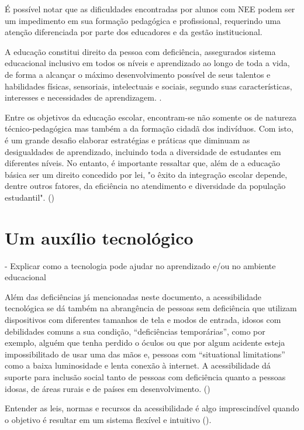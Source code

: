 É possível notar que as dificuldades encontradas por alunos com NEE podem ser um impedimento em sua formação pedagógica e profissional, requerindo uma atenção diferenciada por parte dos educadores e da gestão institucional. 

\begin{citacao}
    A educação constitui direito da pessoa com deficiência, assegurados sistema educacional inclusivo em todos os níveis e aprendizado ao longo de toda a vida, de forma a alcançar o máximo desenvolvimento possível de seus talentos e habilidades físicas, sensoriais, intelectuais e sociais, segundo suas características, interesses e necessidades de aprendizagem.  \cite[art.27]{lei2015}.
\end{citacao}

Entre os objetivos da educação escolar, encontram-se não somente os de natureza técnico-pedagógica mas também a da formação cidadã dos indivíduos. Com isto, é um grande desafio elaborar estratégias e práticas que diminuam as desigualdades de aprendizado, incluindo toda a diversidade de estudantes em diferentes níveis. No entanto, é importante ressaltar que, além de a educação básica ser um direito concedido por lei, "o êxito da integração escolar depende, dentre outros fatores, da eficiência no
atendimento e diversidade da população estudantil". (\cite[p. 24]{seesp2003})

\section{Um auxílio tecnológico}
\label{sec:}

- Explicar como a tecnologia pode ajudar no aprendizado e/ou no ambiente educacional

Além das deficiências já mencionadas neste documento, a acessibilidade tecnológica se dá também na abrangência de pessoas sem deficiência que utilizam dispositivos com diferentes tamanhos de tela e modos de entrada, idosos com debilidades comuns a sua condição, “deficiências temporárias”, como por exemplo, alguém que tenha perdido o óculos ou que por algum acidente esteja impossibilitado de usar uma das mãos e, pessoas com “situational limitations” como a baixa luminosidade e lenta conexão à internet.
A acessibilidade dá suporte para inclusão social tanto de pessoas com deficiência quanto a pessoas idosas, de áreas rurais e de países em desenvolvimento. ()

Entender as leis, normas e recursos da acessibilidade  é algo imprescindível quando o objetivo  é resultar em um sistema flexível e intuitivo ().


